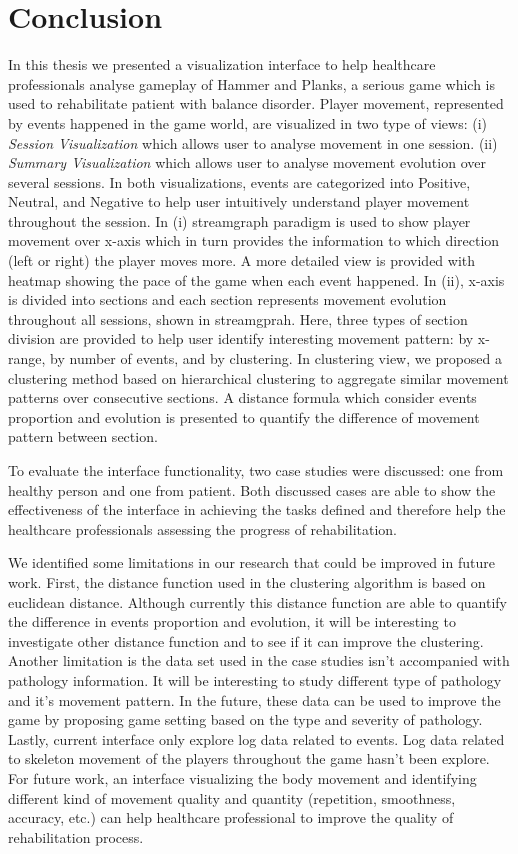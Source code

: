 \chapter{Conclusion}

In this thesis we presented a visualization interface to help healthcare professionals analyse gameplay of Hammer and Planks, a serious game which is used to rehabilitate patient with balance disorder. Player movement, represented by events happened in the game world, are visualized in two type of views: (i) \textit{Session Visualization} which allows user to analyse movement in one session. (ii) \textit{Summary Visualization} which allows user to analyse movement evolution over several sessions. In both visualizations, events are categorized into Positive, Neutral, and Negative to help user intuitively understand player movement throughout the session. In (i) streamgraph paradigm is used to show player movement over x-axis which in turn provides the information to which direction (left or right) the player moves more. A more detailed view is provided with heatmap showing the pace of the game when each event happened. In (ii), x-axis is divided into sections and each section represents movement evolution throughout all sessions, shown in streamgprah. Here, three types of section division are provided to help user identify interesting movement pattern: by x-range, by number of events, and by clustering. In clustering view, we proposed a clustering method based on hierarchical clustering to aggregate similar movement patterns over consecutive sections. A distance formula which consider events proportion and evolution is presented to quantify the difference of movement pattern between section.

To evaluate the interface functionality, two case studies were discussed: one from healthy person and one from patient. Both discussed cases are able to show the effectiveness of the interface in achieving the tasks defined and therefore help the healthcare professionals assessing the progress of rehabilitation.

We identified some limitations in our research that could be improved in future work. First, the distance function used in the clustering algorithm is based on euclidean distance. Although currently this distance function are able to quantify the difference in events proportion and evolution, it will be interesting to investigate other distance function and to see if it can improve the clustering. Another limitation is the data set used in the case studies isn't accompanied with pathology information. It will be interesting to study different type of pathology and it's movement pattern. In the future, these data can be used to improve the game by proposing game setting based on the type and severity of pathology. Lastly, current interface only explore log data related to events. Log data related to skeleton movement of the players throughout the game hasn't been explore. For future work, an interface visualizing the body movement and identifying different kind of movement quality and quantity (repetition, smoothness, accuracy, etc.) can help healthcare professional to improve the quality of rehabilitation process.


